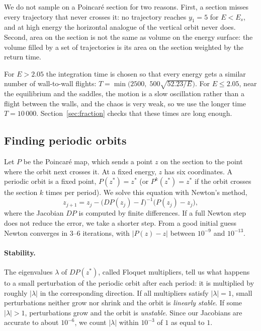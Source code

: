\documentclass[11pt,a4paper]{article}
\begin{document}
We do not sample on a Poincar\'e section for two reasons. First, a section
misses every trajectory that never crosses it: no trajectory reaches $y_1=5$
for $E<E_s$, and at high energy the horizontal analogue of the vertical orbit
never does. Second, area on the section is not the same as volume on the
energy surface: the volume filled by a set of trajectories is its area on the
section weighted by the return time.

For $E>2.05$ the integration time is chosen so that every energy gets a
similar number of wall-to-wall flights:
$T=\min\bigl(2500,\;500\sqrt{52.23/E}\bigr)$. For $E\le2.05$, near the
equilibrium and the saddles, the motion is a slow oscillation rather than a
flight between the walls, and the chaos is very weak, so we use the longer
time $T=10\,000$. Section~\ref{sec:fraction} checks that these times are long
enough.

\subsection{Finding periodic orbits}\label{sec:newton}
Let $P$ be the Poincar\'e map, which sends a point $z$ on the section to the
point where the orbit next crosses it. At a fixed energy, $z$ has six
coordinates. A periodic orbit is a fixed point, $P(z^*)=z^*$ (or
$P^k(z^*)=z^*$ if the orbit crosses the section $k$ times per period). We solve
this equation with Newton's method,
\begin{equation}\label{eq:newton}
  z_{j+1}=z_j-\bigl(DP(z_j)-I\bigr)^{-1}\bigl(P(z_j)-z_j\bigr),
\end{equation}
where the Jacobian $DP$ is computed by finite differences. If a full Newton
step does not reduce the error, we take a shorter step. From a good initial
guess Newton converges in 3--6 iterations, with $|P(z)-z|$ between $10^{-9}$
and $10^{-13}$.

\paragraph{Stability.}
The eigenvalues $\lambda$ of $DP(z^*)$, called Floquet multipliers, tell us
what happens to a small perturbation of the periodic orbit after each period:
it is multiplied by roughly $|\lambda|$ in the corresponding direction. If all
multipliers satisfy $|\lambda|=1$, small perturbations neither grow nor shrink
and the orbit is \emph{linearly stable}. If some $|\lambda|>1$, perturbations
grow and the orbit is \emph{unstable}. Since our Jacobians are accurate to
about $10^{-6}$, we count $|\lambda|$ within $10^{-3}$ of $1$ as equal to $1$.
\end{document}
